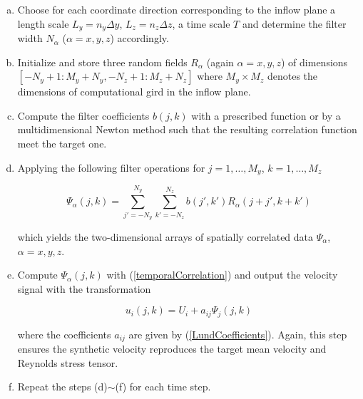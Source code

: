 \begin{enumerate}[(a)]

\item Choose for each coordinate direction corresponding to the inflow plane a length scale $L_y = n_y\varDelta y$, $L_z = n_z\varDelta z$, a time scale $T$ and determine the filter width $N_{\alpha}$ ($\alpha =x,y,z$) accordingly.

\item Initialize and store three random fields $R_{\alpha}$ (again $\alpha =x,y,z$) of dimensions $[-N_y+1:M_y+N_y,-N_z+1:M_z+N_z]$ where $M_y \times M_z$ denotes the dimensions of computational gird in the inflow plane.

\item Compute the filter coefficients $b(j,k)$ with a prescribed function or by a multidimensional Newton method such that the resulting correlation function meet the target one.

\item Applying the following filter operations for $j=1,\ldots,M_y$, $k=1,\ldots,M_z$

\begin{equation}
\varPsi_{\alpha}(j,k) = \sum_{j'=-N_y}^{N_y}\sum_{k'=-N_z}^{N_z}b(j',k')R_{\alpha}(j+j',k+k')
\end{equation}

\noindent which yields the two-dimensional arrays of spatially correlated data $\varPsi_{\alpha}$, $\alpha =x,y,z$.

\item Compute $\Psi_{\alpha}(j,k)$ with (\ref{temporalCorrelation}) and output the velocity signal with the transformation

\begin{equation}
u_i(j,k) = U_i + a_{ij}\Psi_j(j,k)
\end{equation}

\noindent where the coefficients $a_{ij}$ are given by (\ref{LundCoefficients}). Again, this step ensures the synthetic velocity reproduces the target mean velocity and Reynolds stress tensor.

\item Repeat the steps (d)$\sim$(f) for each time step.

\end{enumerate}


